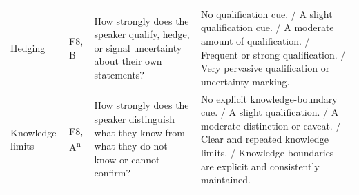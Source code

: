 \begin{longtable}{@{}p{2.2cm}p{1.0cm}p{4.7cm}p{7.0cm}@{}}
\addlinespace[2pt]
Hedging & F8, B & How strongly does the speaker qualify, hedge, or signal uncertainty about their own statements? & No qualification cue. / A slight qualification cue. / A moderate amount of qualification. / Frequent or strong qualification. / Very pervasive qualification or uncertainty marking. \\
\addlinespace[2pt]
Knowledge limits & F8, A\textsuperscript{n} & How strongly does the speaker distinguish what they know from what they do not know or cannot confirm? & No explicit knowledge-boundary cue. / A slight qualification. / A moderate distinction or caveat. / Clear and repeated knowledge limits. / Knowledge boundaries are explicit and consistently maintained. \\
\end{longtable}
